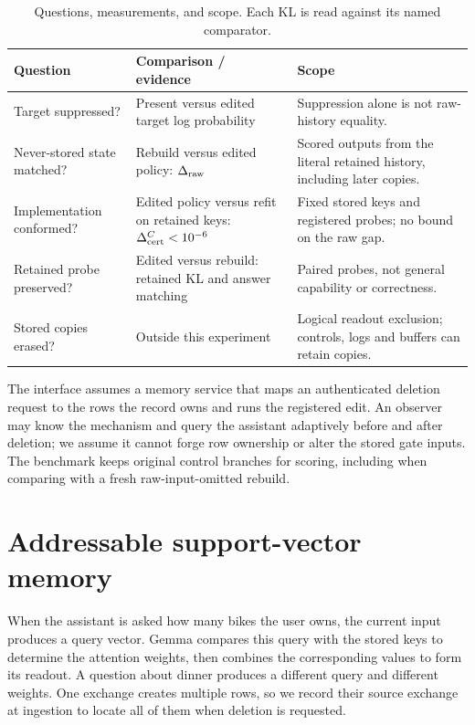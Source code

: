 \begin{table}[t]
\centering
\caption{Questions, measurements, and scope. Each KL is read against its named comparator.}
\label{tab:metric-guide}
\small
\setlength{\tabcolsep}{3pt}
\begin{tabular}{@{}>{\raggedright\arraybackslash}p{.23\linewidth}>{\raggedright\arraybackslash}p{.38\linewidth}>{\raggedright\arraybackslash}p{.33\linewidth}@{}}
\toprule
Question & Comparison / evidence & Scope \\
\midrule
Target suppressed? & Present versus edited target log probability & Suppression alone is not raw-history equality. \\
Never-stored state matched? & Rebuild versus edited policy: \(\Delta_{\rm raw}\) & Scored outputs from the literal retained history, including later copies. \\
Implementation conformed? & Edited policy versus refit on retained keys: \(\Delta_{\rm cert}^{C}<10^{-6}\) & Fixed stored keys and registered probes; no bound on the raw gap. \\
Retained probe preserved? & Edited versus rebuild: retained KL and answer matching & Paired probes, not general capability or correctness. \\
Stored copies erased? & Outside this experiment & Logical readout exclusion; controls, logs and buffers can retain copies. \\
\bottomrule
\end{tabular}

\end{table}

The interface assumes a memory service that maps an authenticated deletion
request to the rows the record owns and runs the registered edit. An observer
may know the mechanism and query the assistant adaptively before and after
deletion; we assume it cannot forge row ownership or alter the stored gate inputs.
The benchmark keeps original control branches for scoring, including when
comparing with a fresh raw-input-omitted rebuild.

\section{Addressable support-vector memory}\label{sec:mechanism}

When the assistant is asked how many bikes the user owns, the current input
produces a query vector. Gemma compares this query with the stored keys to
determine the attention weights, then combines the corresponding values to
form its readout. A question about dinner produces a different query and
different weights. One exchange creates multiple rows, so we record their
source exchange at ingestion to locate all of them when deletion is requested.

